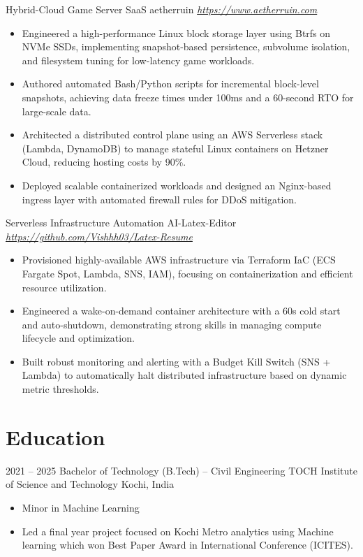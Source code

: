 \documentclass[10pt, a4paper, sans]{moderncv}
\begin{document}
\cventry
  {}
  {Hybrid-Cloud Game Server SaaS}
  {aetherruin}
  {\textit{\url{https://www.aetherruin.com}}}
  {}
  {
  \begin{itemize}\setlength{\itemsep}{2pt}
    \item Engineered a high-performance Linux block storage layer using Btrfs on NVMe SSDs, implementing snapshot-based persistence, subvolume isolation, and filesystem tuning for low-latency game workloads.
    \item Authored automated Bash/Python scripts for incremental block-level snapshots, achieving data freeze times under 100ms and a 60-second RTO for large-scale data.
    \item Architected a distributed control plane using an AWS Serverless stack (Lambda, DynamoDB) to manage stateful Linux containers on Hetzner Cloud, reducing hosting costs by 90\%.
    \item Deployed scalable containerized workloads and designed an Nginx-based ingress layer with automated firewall rules for DDoS mitigation.
  \end{itemize}
  }

\vspace{1mm}

\cventry
  {}
  {Serverless Infrastructure Automation}
  {AI-Latex-Editor}
  {\textit{\url{https://github.com/Vishhh03/Latex-Resume}}}
  {}
  {
  \begin{itemize}\setlength{\itemsep}{2pt}
    \item Provisioned highly-available AWS infrastructure via Terraform IaC (ECS Fargate Spot, Lambda, SNS, IAM), focusing on containerization and efficient resource utilization.
    \item Engineered a wake-on-demand container architecture with a 60s cold start and auto-shutdown, demonstrating strong skills in managing compute lifecycle and optimization.
    \item Built robust monitoring and alerting with a Budget Kill Switch (SNS + Lambda) to automatically halt distributed infrastructure based on dynamic metric thresholds.
  \end{itemize}
  }

\section{Education}

\cventry
  {2021 -- 2025}
  {Bachelor of Technology (B.Tech) -- Civil Engineering}
  {TOCH Institute of Science and Technology}
  {Kochi, India}
  {}
  {
  \begin{itemize}\setlength{\itemsep}{2pt}
    \item Minor in Machine Learning
    \item Led a final year project focused on Kochi Metro analytics using Machine learning which won Best Paper Award in International Conference (ICITES).
  \end{itemize}
  }
\end{document}

